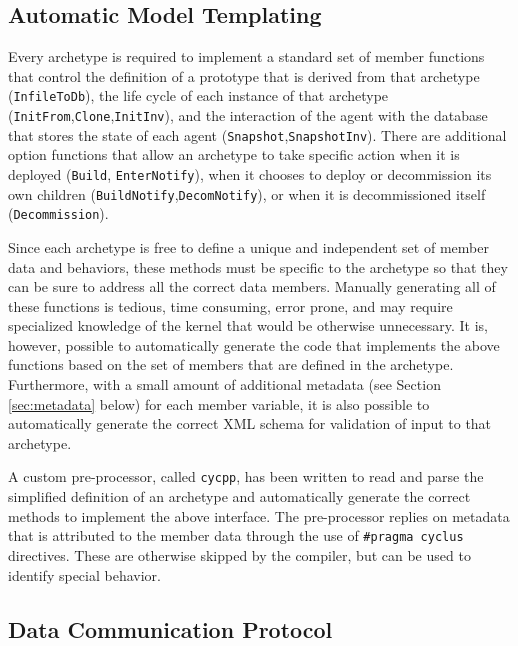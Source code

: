 \subsection{Automatic Model Templating}
\label{sec:code_gen}

Every \Cyclus archetype is required to implement a standard set of member
functions that control the definition of a prototype that is derived from that
archetype (\texttt{InfileToDb}), the life cycle of each instance of that
archetype (\texttt{InitFrom},\texttt{Clone},\texttt{InitInv}), and the
interaction of the agent with the database that stores the state of each agent
(\texttt{Snapshot},\texttt{SnapshotInv}).  There are additional option
functions that allow an archetype to take specific action when it is deployed
(\texttt{Build}, \texttt{EnterNotify}), when it chooses to deploy or
decommission its own children (\texttt{BuildNotify},\texttt{DecomNotify}), or
when it is decommissioned itself (\texttt{Decommission}).

Since each archetype is free to define a unique and independent set of member
data and behaviors, these methods must be specific to the archetype so that
they can be sure to address all the correct data members.  Manually generating
all of these functions is tedious, time consuming, error prone, and may
require specialized knowledge of the \Cyclus kernel that would be otherwise
unnecessary.  It is, however, possible to automatically generate the code that
implements the above functions based on the set of members that are defined in
the archetype.  Furthermore, with a small amount of additional metadata (see
Section \ref{sec:metadata} below) for each member variable, it is also
possible to automatically generate the correct \gls{XML} schema for validation
of input to that archetype.

A custom pre-processor, called \texttt{cycpp}, has been written to read and
parse the simplified definition of an archetype and automatically generate the
correct methods to implement the above interface.  The pre-processor replies on
metadata that is attributed to the member data through the use of
\texttt{\#pragma cyclus} directives.  These are otherwise skipped by the
compiler, but can be used to identify special behavior.

\subsection{Data Communication Protocol}

